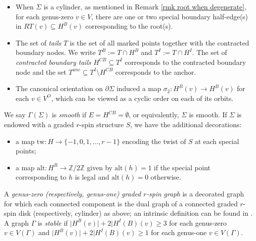 \documentclass[11pt]{amsart}
\theoremstyle{definition}
\theoremstyle{remark}
\newcommand{\<}{\left<}
\renewcommand{\>}{\right>}
\numberwithin{equation}{section}
\begin{document}
\begin{itemize}
\item
When $\Sigma$ is a cylinder, as mentioned in Remark \ref{rmk root when degenerate}, for each genus-zero $v \in V$, there are one or two special boundary half-edge(s) in $RT(v)\subseteq H^B(v)$ corresponding to the root(s). 

\item The set of \textit{tails} $T$ is the set of all marked points together with the contracted boundary nodes. We write $T^B:=T\cap H^B$ and $T^I:=T\cap H^I$. The set of \textit{contracted boundary tails} $H^{CB}\subseteq T^I$ corresponds to the contracted boundary node and the set $T^{anc}\subseteq T^I\setminus H^{CB}$ corresponds to the anchor.
\item 
The canonical orientation on %
$\partial\Sigma$ induced a %
map $\sigma_2\colon H^B(v) \to H^B(v)$ for each %
$v\in V^O$, which %
can be viewed as a cyclic order on each of its orbits.
\end{itemize}
We say $\Gamma(\Sigma)$ is \textit{smooth} if %
$E = H^{CB} = \emptyset$, or equivalently, %
$\Sigma$ is smooth.
If $\Sigma$ is endowed with a graded $r$-spin structure $S$, we have the additional %
decorations:
\begin{itemize}
    \item a map %
$\text{tw}: H \rightarrow \{-1,0,1,\ldots, r-1\}$ encoding the twist of $S$ at each special points;
    \item a map
$\text{alt}: H^B \rightarrow \mathbb{Z}/2\mathbb{Z}$
given by $\text{alt}(h) = 1$ if the special point corresponding to $h$ is legal and $\text{alt}(h) = 0$ otherwise.
\end{itemize}



A \textit{genus-zero (respectively, genus-one) graded $r$-spin graph} is a decorated graph for which each connected component is the dual graph of a connected graded $r$-spin disk (respectively, cylinder) as above; an intrinsic definition can be found in \cite[\S 3.2]{TZ1}. A graph $\Gamma$ is \textit{stable} if $\lvert H^B(v)\rvert +2\lvert H^I(B)(v)\ge 3$ for each genus-zero $v\in V(\Gamma)$ and $\lvert H^B(v)\rvert +2\lvert H^I(B)(v)\ge 1$ for each genus-one $v\in V(\Gamma)$.
\end{document}
